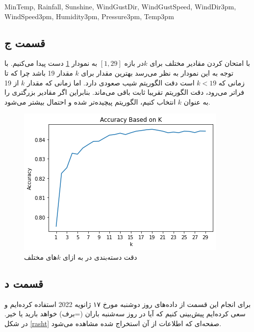 \documentclass{article}
\begin{document}
\begin{center}
    \begin{latin}
        MinTemp, Rainfall, Sunshine, WindGustDir, WindGustSpeed, WindDir3pm, \\
        WindSpeed3pm, Humidity3pm, Pressure3pm, Temp3pm
    \end{latin}
\end{center}

\subsection*{قسمت ج}

با امتحان کردن مقادیر مختلف برای $k$در بازه $[1,29]$ به نمودار \ref{accuracy_k} دست پیدا می‌کنیم.
با توجه به این نمودار به نظر می‌رسد بهترین مقدار برای $k$ مقدار 19 باشد چرا که
تا زمانی که $k<19$ است دقت الگوریتم شیب صعودی دارد. اما زمانی که مقدار $k$ از 19 فراتر می‌رود،
دقت الگوریتم تقریبا ثابت باقی می‌ماند. بنابراین اگر مقادیر بزرگتری را به عنوان $k$ انتخاب کنیم،
الگوریتم پیچیده‌تر شده و احتمال  بیشتر می‌شود.

\begin{figure}
    \centering
    \includegraphics[width=0.7\linewidth]{images/q3/accuracy_k.png}
    \caption{دقت دسته‌بندی  در به ازای $k$های مختلف}
    \label{accuracy_k}
\end{figure}

\subsection*{قسمت د}

برای انجام این قسمت از داده‌های روز دوشنبه مورخ ۱۷ ژانویه 2022 استفاده کرده‌ایم و سعی کرده‌ایم پیش‌بینی کنیم
که آیا در روز سه‌شنبه باران (=برف) خواهد بارید یا خیر. در شکل \ref{rasht}
صفحه‌ای که اطلاعات از آن استخراج شده مشاهده می‌شود.
\end{document}
